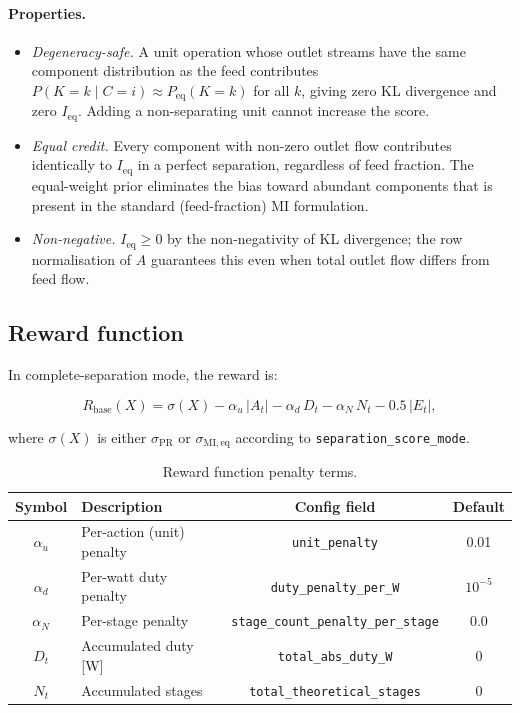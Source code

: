 \documentclass[11pt,a4paper]{article}
\theoremstyle{definition}
\theoremstyle{plain}
\newcommand{\abs}[1]{\left|#1\right|}
\begin{document}
\paragraph{Properties.}
\begin{itemize}
 \item \textit{Degeneracy-safe.} A unit operation whose outlet streams have the same component distribution as the feed contributes $P(K=k \mid C=i) \approx P_{\mathrm{eq}}(K=k)$ for all $k$, giving zero KL divergence and zero $I_{\mathrm{eq}}$. Adding a non-separating unit cannot increase the score.
 \item \textit{Equal credit.} Every component with non-zero outlet flow contributes identically to $I_{\mathrm{eq}}$ in a perfect separation, regardless of feed fraction. The equal-weight prior eliminates the bias toward abundant components that is present in the standard (feed-fraction) MI formulation.
 \item \textit{Non-negative.} $I_{\mathrm{eq}} \geq 0$ by the non-negativity of KL divergence; the row normalisation of $A$ guarantees this even when total outlet flow differs from feed flow.
\end{itemize}

\subsection{Reward function}
\label{sec:reward_fn}

In complete-separation mode, the reward is:

\begin{equation}
 R_{\mathrm{base}}(X)
 = \sigma(X)
 - \alpha_u\, \abs{A_t}
 - \alpha_d\, D_t
 - \alpha_N\, N_t
 - 0.5\, \abs{E_t},
 \label{eq:reward_base}
\end{equation}

where $\sigma(X)$ is either $\sigma_{\mathrm{PR}}$ or $\sigma_{\mathrm{MI,eq}}$ according to \texttt{separation\_score\_mode}.

\begin{table}[ht]
\centering
\caption{Reward function penalty terms.}
\label{tab:penalties}
\begin{tabular}{@{}clcc@{}}
\toprule
Symbol & Description & Config field & Default \\
\midrule
$\alpha_u$ & Per-action (unit) penalty & \texttt{unit\_penalty} & 0.01 \\
$\alpha_d$ & Per-watt duty penalty & \texttt{duty\_penalty\_per\_W} & $10^{-5}$ \\
$\alpha_N$ & Per-stage penalty & \texttt{stage\_count\_penalty\_per\_stage} & 0.0 \\
$D_t$ & Accumulated duty [W] & \texttt{total\_abs\_duty\_W} & 0 \\
$N_t$ & Accumulated stages & \texttt{total\_theoretical\_stages} & 0 \\
\bottomrule
\end{tabular}
\end{table}
\end{document}
